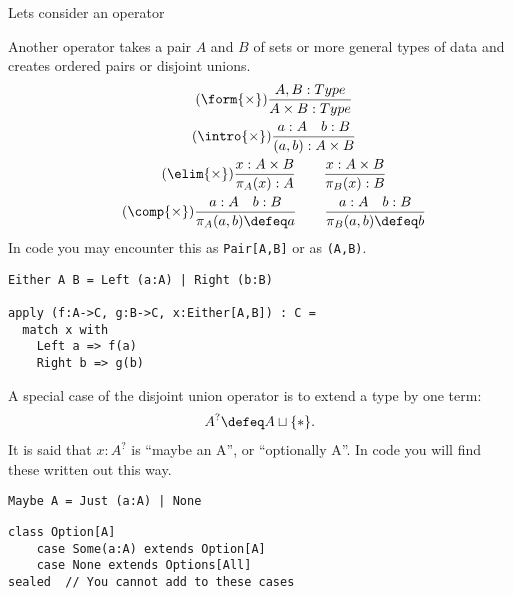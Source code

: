 
Lets consider an operator 

Another operator takes a pair $A$ and $B$ of sets or more general types 
of data and creates ordered pairs or disjoint unions.
\begin{gather}
    \tag{$\form{\times}$}
    \frac{A,B:Type}{A\times B:Type}\\
    \tag{$\intro{\times}$}
    \frac{a:A\quad b:B}{(a,b):A\times B}\\
    \tag{$\elim{\times}$}
    \frac{x:A\times B}{\pi_A(x):A}\qquad 
    \frac{x:A\times B}{\pi_B(x):B}\\
    \tag{$\comp{\times}$}
    \frac{a:A\quad b:B}{\pi_A(a,b)\defeq a}
    \qquad
    \frac{a:A\quad b:B}{\pi_B(a,b)\defeq b}
\end{gather}
In code you may encounter this as \lstinline{Pair[A,B]} or 
as \lstinline{(A,B)}.

\begin{lstlisting}[language=Hidris]
Either A B = Left (a:A) | Right (b:B)

apply (f:A->C, g:B->C, x:Either[A,B]) : C =
  match x with 
    Left a => f(a)
    Right b => g(b)
\end{lstlisting}
A special case of the disjoint union operator is to extend a type by 
one term:
\begin{align*}
    A^? \defeq A\sqcup \{*\}.
\end{align*}
It is said that $x:A^?$ is ``maybe an A'', or ``optionally A''.
In code you will find these written out this way.
\begin{lstlisting}[language=Hidris]
Maybe A = Just (a:A) | None
\end{lstlisting}
\begin{lstlisting}[language=Sava]
class Option[A]
    case Some(a:A) extends Option[A]
    case None extends Options[All]    
sealed  // You cannot add to these cases
\end{lstlisting}